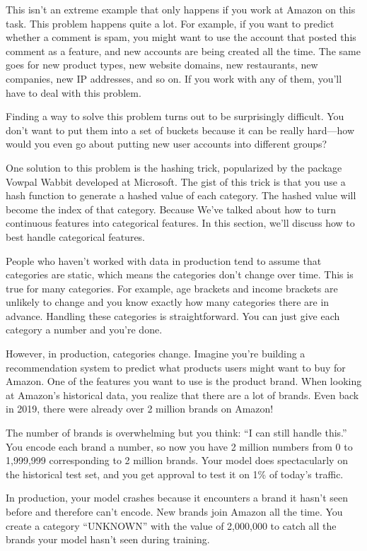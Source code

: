 \documentclass[openany]{book}
\begin{document}
This isn’t an extreme example that only happens if you work at Amazon on this task. This problem happens quite a lot. For example, if you want to predict whether a comment is spam, you might want to use the account that posted this comment as a feature, and new accounts are being created all the time. The same goes for new product types, new website domains, new restaurants, new companies, new IP addresses, and so on. If you work with any of them, you’ll have to deal with this problem.

Finding a way to solve this problem turns out to be surprisingly difficult. You don’t want to put them into a set of buckets because it can be really hard—how would you even go about putting new user accounts into different groups?

One solution to this problem is the hashing trick, popularized by the package Vowpal Wabbit developed at Microsoft. The gist of this trick is that you use a hash function to generate a hashed value of each category. The hashed value will become the index of that category. Because  We’ve talked about how to turn continuous features into categorical features. In this section, we’ll discuss how to best handle categorical features.

People who haven’t worked with data in production tend to assume that categories are static, which means the categories don’t change over time. This is true for many categories. For example, age brackets and income brackets are unlikely to change and you know exactly how many categories there are in advance. Handling these categories is straightforward. You can just give each category a number and you’re done.

However, in production, categories change. Imagine you’re building a recommendation system to predict what products users might want to buy for Amazon. One of the features you want to use is the product brand. When looking at Amazon’s historical data, you realize that there are a lot of brands. Even back in 2019, there were already over 2 million brands on Amazon!

The number of brands is overwhelming but you think: “I can still handle this.” You encode each brand a number, so now you have 2 million numbers from 0 to 1,999,999 corresponding to 2 million brands. Your model does spectacularly on the historical test set, and you get approval to test it on 1\% of today’s traffic.

In production, your model crashes because it encounters a brand it hasn’t seen before and therefore can’t encode. New brands join Amazon all the time. You create a category “UNKNOWN” with the value of 2,000,000 to catch all the brands your model hasn’t seen during training.
\end{document}
